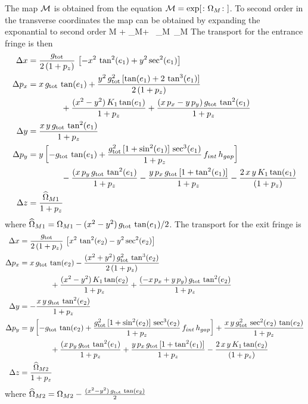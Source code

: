 The map $\cal M$ is obtained from the equation ${\cal M} = \exp[\colon\Omega_M\colon]$. To second order in the
transverse coordinates the map can be obtained by expanding the exponantial to second order
\Begineq
  \Cal M  + \colon\Omega_M\colon +  \, \colon\Omega_M\colon \, \colon\Omega_M\colon
\Endeq
The transport for the entrance fringe is then
\begin{align}
  \Delta x &= \frac{g_{\text{tot}}}{2 \, (1 + p_z)} \, \left[ -x^2 \, \tan^2 (e_1) + y^2 \sec^2 (e_1) \right] \nonumber \\
  \Delta p_x &= x \, g_{\text{tot}} \, \tan (e_1)
    + \frac{y^2 \, g_{\text{tot}}^2 \, [ \tan (e_1) + 2 \, \tan^3 (e_1) ]}{2 \, (1 + p_z)} \nonumber \\
    &\qquad\qquad + \frac{(x^2 - y^2) \, K_1 \tan (e_1)}{1 + p_z}
    + \frac{(x \, p_x - y \, p_y) \, g_{\text{tot}} \, \tan^2 (e_1)}{1 + p_z} \nonumber \\
  \Delta y &= \frac{x \, y \, g_{\text{tot}} \, \tan^2 (e_1)}{1 + p_z} \\
  \Delta p_y &= y \left[ -g_{\text{tot}} \, \tan (e_1)
    + \frac{g^2_{\text{tot}} \, [1 + \sin^2 (e_1)] \, \sec^3 (e_1)}{1 + p_z} \, f_{int} \,  h_{gap} \right] \nonumber \\
    &\qquad\qquad - \frac{(x \, p_y \, g_{\text{tot}} \, \tan^2 (e_1)}{1 + p_z} 
    - \frac{y \, p_x \, g_{\text{tot}} \, [1 + \tan^2 (e_1)]}{1 + p_z} 
    - \frac{2 \, x \, y \, K_1 \tan (e_1)}{(1 + p_z)} \nonumber \\
  \Delta z &= \frac{\widehat \Omega_{M1}}{1 + p_z} \nonumber
\end{align}
where $\widehat \Omega_{M1} = \Omega_{M1} - (x^2 - y^2) \, g_{\text{tot}} \, \tan (e_1)/2$.
The transport for the exit fringe is
\begin{align}
  \Delta x &= \frac{g_{\text{tot}}}{2 \, (1 + p_z)} \, \left[ x^2 \, \tan^2 (e_2) - y^2 \sec^2 (e_2) \right] \nonumber \\
  \Delta p_x &= x \, g_{\text{tot}} \, \tan (e_2)
    - \frac{(x^2 + y^2) \, g_{\text{tot}}^2 \, \tan^3 (e_2)}{2 \, (1 + p_z)} \nonumber \\
    &\qquad\qquad + \frac{(x^2 - y^2) \, K_1 \tan (e_2)}{1 + p_z}
    + \frac{(-x \, p_x + y \, p_y) \, g_{\text{tot}} \, \tan^2 (e_2)}{1 + p_z} \nonumber \\
  \Delta y &= -\frac{x \, y \, g_{\text{tot}} \, \tan^2 (e_2)}{1 + p_z} \\
  \Delta p_y &= y \left[ -g_{\text{tot}} \, \tan (e_2)
    + \frac{g^2_{\text{tot}} \, [1 + \sin^2 (e_2)] \, \sec^3 (e_2)}{1 + p_z} \, f_{int} \,  h_{gap} \right]
    + \frac{x \, y \, g^2_{\text{tot}} \, \sec^2 (e_2) \, \tan (e_2)}{1 + p_z} \nonumber \\
    &\qquad\qquad + \frac{(x \, p_y \, g_{\text{tot}} \, \tan^2 (e_1)}{1 + p_z} 
    + \frac{y \, p_x \, g_{\text{tot}} \, [1 + \tan^2 (e_1)]}{1 + p_z} 
    - \frac{2 \, x \, y \, K_1 \tan (e_2)}{(1 + p_z)} \nonumber \\
  \Delta z &= \frac{\widehat \Omega_{M2}}{1 + p_z} \nonumber
\end{align}
where $\widehat \Omega_{M2} = \Omega_{M2} - \frac{(x^2 - y^2) \, g_{\text{tot}} \, \tan (e_2)}{2}$

